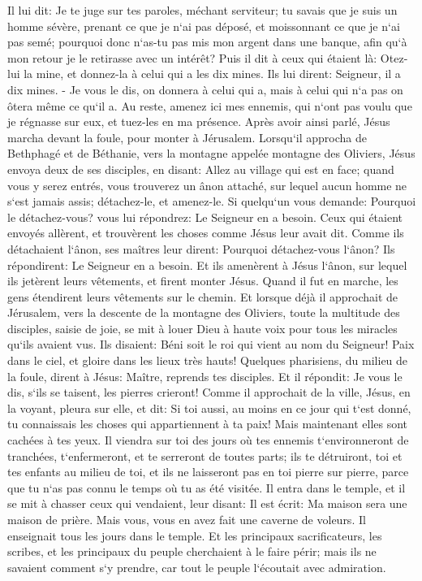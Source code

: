 \verse Il lui dit: Je te juge sur tes paroles, méchant serviteur; tu savais que je suis un homme sévère, prenant ce que je n`ai pas déposé, et moissonnant ce que je n`ai pas semé; 
\verse pourquoi donc n`as-tu pas mis mon argent dans une banque, afin qu`à mon retour je le retirasse avec un intérêt? 
\verse Puis il dit à ceux qui étaient là: Otez-lui la mine, et donnez-la à celui qui a les dix mines. 
\verse Ils lui dirent: Seigneur, il a dix mines. - 
\verse Je vous le dis, on donnera à celui qui a, mais à celui qui n`a pas on ôtera même ce qu`il a. 
\verse Au reste, amenez ici mes ennemis, qui n`ont pas voulu que je régnasse sur eux, et tuez-les en ma présence. 
\verse Après avoir ainsi parlé, Jésus marcha devant la foule, pour monter à Jérusalem. 
\verse Lorsqu`il approcha de Bethphagé et de Béthanie, vers la montagne appelée montagne des Oliviers, Jésus envoya deux de ses disciples, 
\verse en disant: Allez au village qui est en face; quand vous y serez entrés, vous trouverez un ânon attaché, sur lequel aucun homme ne s`est jamais assis; détachez-le, et amenez-le. 
\verse Si quelqu`un vous demande: Pourquoi le détachez-vous? vous lui répondrez: Le Seigneur en a besoin. 
\verse Ceux qui étaient envoyés allèrent, et trouvèrent les choses comme Jésus leur avait dit. 
\verse Comme ils détachaient l`ânon, ses maîtres leur dirent: Pourquoi détachez-vous l`ânon? 
\verse Ils répondirent: Le Seigneur en a besoin. 
\verse Et ils amenèrent à Jésus l`ânon, sur lequel ils jetèrent leurs vêtements, et firent monter Jésus. 
\verse Quand il fut en marche, les gens étendirent leurs vêtements sur le chemin. 
\verse Et lorsque déjà il approchait de Jérusalem, vers la descente de la montagne des Oliviers, toute la multitude des disciples, saisie de joie, se mit à louer Dieu à haute voix pour tous les miracles qu`ils avaient vus. 
\verse Ils disaient: Béni soit le roi qui vient au nom du Seigneur! Paix dans le ciel, et gloire dans les lieux très hauts! 
\verse Quelques pharisiens, du milieu de la foule, dirent à Jésus: Maître, reprends tes disciples. 
\verse Et il répondit: Je vous le dis, s`ils se taisent, les pierres crieront! 
\verse Comme il approchait de la ville, Jésus, en la voyant, pleura sur elle, et dit: 
\verse Si toi aussi, au moins en ce jour qui t`est donné, tu connaissais les choses qui appartiennent à ta paix! Mais maintenant elles sont cachées à tes yeux. 
\verse Il viendra sur toi des jours où tes ennemis t`environneront de tranchées, t`enfermeront, et te serreront de toutes parts; 
\verse ils te détruiront, toi et tes enfants au milieu de toi, et ils ne laisseront pas en toi pierre sur pierre, parce que tu n`as pas connu le temps où tu as été visitée. 
\verse Il entra dans le temple, et il se mit à chasser ceux qui vendaient, 
\verse leur disant: Il est écrit: Ma maison sera une maison de prière. Mais vous, vous en avez fait une caverne de voleurs. 
\verse Il enseignait tous les jours dans le temple. Et les principaux sacrificateurs, les scribes, et les principaux du peuple cherchaient à le faire périr; 
\verse mais ils ne savaient comment s`y prendre, car tout le peuple l`écoutait avec admiration. 


